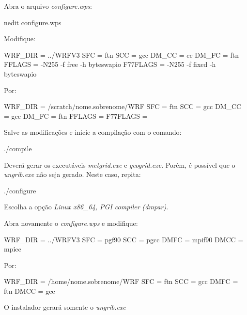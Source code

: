 \noindent Abra o arquivo \textit{configure.wps}:
\bigskip

\begin{bashcode}
nedit configure.wps
\end{bashcode}
\bigskip

\noindent Modifique:
\bigskip

\begin{bashcode}
WRF_DIR  = ../WRFV3
SFC      = ftn
SCC      = gcc
DM_CC    = cc
DM_FC    = ftn
FFLAGS   = -N255 -f free -h byteswapio
F77FLAGS = -N255 -f fixed -h byteswapio

\end{bashcode}
\bigskip

\noindent Por:
\bigskip

\begin{bashcode}
WRF_DIR  = /scratch/nome.sobrenome/WRF
SFC      = ftn
SCC      = gcc
DM_CC    = gcc
DM_FC    = ftn
FFLAGS   =
F77FLAGS =
\end{bashcode}
\bigskip

\noindent Salve as modificações e inicie a compilação com o comando:
\bigskip

\begin{bashcode}
./compile
\end{bashcode}
\bigskip

\noindent Deverá gerar os executáveis \textit{metgrid.exe} e \textit{geogrid.exe}. Porém, é possível que o \textit{ungrib.exe} não seja gerado. Neste caso, repita:
\bigskip

\begin{bashcode}
./configure
\end{bashcode}
\bigskip

\noindent Escolha a opção \textit{Linux x86\_64, PGI compiler (dmpar)}.
\bigskip

\noindent Abra novamente o \textit{configure.wps} e modifique:
\bigskip

\begin{bashcode}
WRF_DIR = ../WRFV3
SFC     = pgf90
SCC     = pgcc
DMFC    = mpif90
DMCC    = mpicc
\end{bashcode}
\bigskip

\noindent Por:
\bigskip

\begin{bashcode}
WRF_DIR = /home/nome.sobrenome/WRF
SFC     = ftn
SCC     = gcc
DMFC    = ftn
DMCC    = gcc
\end{bashcode}
\bigskip

\noindent O instalador gerará somente o \textit{ungrib.exe}


